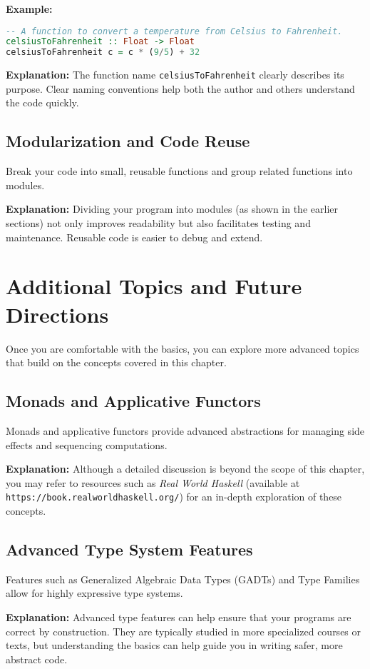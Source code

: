 \documentclass[11pt,a4paper]{article}
\begin{document}
\textbf{Example:}
\begin{lstlisting}[language=Haskell]
-- A function to convert a temperature from Celsius to Fahrenheit.
celsiusToFahrenheit :: Float -> Float
celsiusToFahrenheit c = c * (9/5) + 32
\end{lstlisting}

\textbf{Explanation:}  
The function name \texttt{celsiusToFahrenheit} clearly describes its purpose. Clear naming conventions help both the author and others understand the code quickly.

\subsection{Modularization and Code Reuse}
Break your code into small, reusable functions and group related functions into modules.

\textbf{Explanation:}  
Dividing your program into modules (as shown in the earlier sections) not only improves readability but also facilitates testing and maintenance. Reusable code is easier to debug and extend.

\section{Additional Topics and Future Directions}
Once you are comfortable with the basics, you can explore more advanced topics that build on the concepts covered in this chapter.

\subsection{Monads and Applicative Functors}
Monads and applicative functors provide advanced abstractions for managing side effects and sequencing computations.

\textbf{Explanation:}  
Although a detailed discussion is beyond the scope of this chapter, you may refer to resources such as \textit{Real World Haskell} (available at \texttt{https://book.realworldhaskell.org/}) for an in-depth exploration of these concepts.

\subsection{Advanced Type System Features}
Features such as Generalized Algebraic Data Types (GADTs) and Type Families allow for highly expressive type systems.

\textbf{Explanation:}  
Advanced type features can help ensure that your programs are correct by construction. They are typically studied in more specialized courses or texts, but understanding the basics can help guide you in writing safer, more abstract code.
\end{document}
